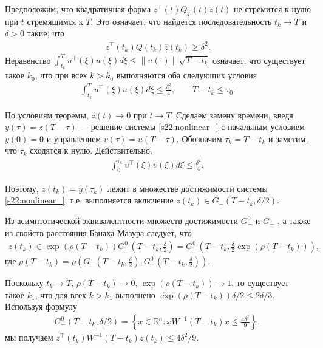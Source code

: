 \documentclass[../main.tex]{subfiles}
\begin{document}
Предположим, что квадратичная форма $z^{\top}(t)Q_T(t)z(t) $ не стремится к нулю при $t$ стремящимся к $T$.
Это означает, что найдется последовательность $ t_k \to T$ и $\delta > 0$ такие, что 
    \begin{gather}\label{s22:zqz_geq_del2}
    z^{\top}(t_k)Q(t_k)z(t_k) \geqslant \delta^2.  
    \end{gather}
Неравенство $ \int_{t_k}^{T} u^{\top}(\xi)u(\xi) d\xi \leqslant 
\|u(\cdot)\|\sqrt{T - t_k}  $ означает, что существует такое $k_0$, что при всех $k > k_0$ выполняются оба следующих условия 
\begin{gather*}
    \int_{t_k}^{T} u^{\top}(\xi)u(\xi) d\xi \leqslant \frac{\delta^2}{4}, \qquad T-t_k \leqslant \tau_0.
\end{gather*}

По условиям теоремы, $z(t) \to 0 $ при $t \to T$. 
Сделаем замену времени,  введя $y(\tau)=z(T-\tau)$ --- решение системы \eqref{s22:nonlinear_} с начальным условием  $y(0)=0$ и управлением $ v(\tau)=u(T-\tau)$. 
Обозначим $\tau_k = T - t_k$ и заметим, что $\tau_k $ сходятся к нулю. 
Действительно,  
\begin{gather*}
    \int_{0}^{\tau_k} \upsilon^{\top}(\xi)\upsilon(\xi) 
    d\xi \leqslant \frac{\delta^2}{4},
\end{gather*}

    
Поэтому, $z(t_k) = y(\tau_k) $ лежит в множестве достижимости системы \eqref{s22:nonlinear_}, т.е. выполняется включение $z(t_k) \in G_{-}(T-t_k,\delta/2)$.
 
 
Из асимптотической эквивалентности множеств достижимости $G_{-}^0$ и $ G_{-}$ \cite{GusOsSteklov}, а также из свойств расстояния Банаха-Мазура следует, что 
\begin{gather*}
    z(t_k) \in \exp(\rho(T-t_k))G_{-}^0(T-t_k,\frac{\delta}{2})=G_{-}^0(T-t_k,\frac{\delta}{2}\exp(\rho(T-t_k)))  ,
\end{gather*}
 где $\rho(T-t_k)=\rho(G_{-}(T-t_k,\frac{\delta}{2}),G_{-}^0(T-t_k,\frac{\delta}{2}))$.

 Поскольку $t_k \to T$, $\rho(T-t_k) \to 0$, $\exp(\rho(T-t_k)) \to 1$, то существует такое $k_1$, что для всех $k > k_1$ выполнено $\exp(\rho(T-t_k))\delta/2 \leqslant 2\delta/3$. 
Используя формулу
\begin{gather*}
G_{-}^0(T-t_k, \delta/2)=\left\{x \in \mathbb{R}^n: x W^{-1}(T-t_k) x \leqslant \frac{4\delta^2}{9} \right\},    
\end{gather*}
мы получаем $ z^{\top}(t_k) W^{-1}(T-t_k) z(t_k) \leqslant 4\delta^2/9$.
\end{document}
